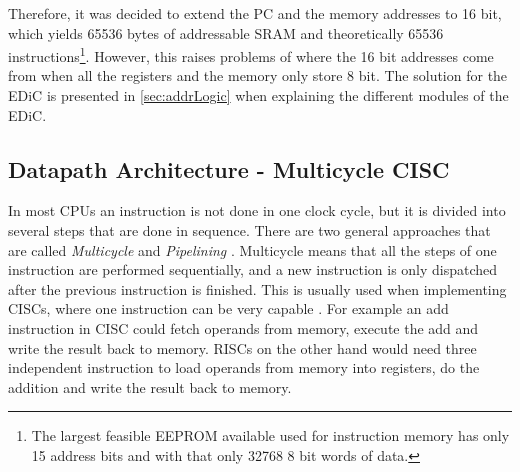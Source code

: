 Therefore, it was decided to extend the \gls{PC} and the memory addresses to 16 bit, which yields 65536 bytes of addressable \gls{SRAM} and theoretically 65536 instructions\footnote{The largest feasible \gls{EEPROM} available used for instruction memory has only 15 address bits and with that only 32768 8 bit words of data.}.
However, this raises problems of where the 16 bit addresses come from when all the registers and the memory only store 8 bit.
The solution for the \gls{EDiC} is presented in \cref{sec:addrLogic} when explaining the different modules of the \gls{EDiC}.

\subsection{Datapath Architecture - Multicycle CISC}\label{sec:cisc}
In most \glspl{CPU} an instruction is not done in one clock cycle, but it is divided into several steps that are done in sequence.
There are two general approaches that are called \emph{Multicycle} and \emph{Pipelining} \cite{PattersonDavid2016RuRD}.
Multicycle means that all the steps of one instruction are performed sequentially, and a new instruction is only dispatched after the previous instruction is finished.
This is usually used when implementing \glspl{CISC}, where one instruction can be very capable \cite{chen_novick_shimano_2000}.
For example an add instruction in \gls{CISC} could fetch operands from memory, execute the add and write the result back to memory.
\glspl{RISC} on the other hand would need three independent instruction to load operands from memory into registers, do the addition and write the result back to memory.

